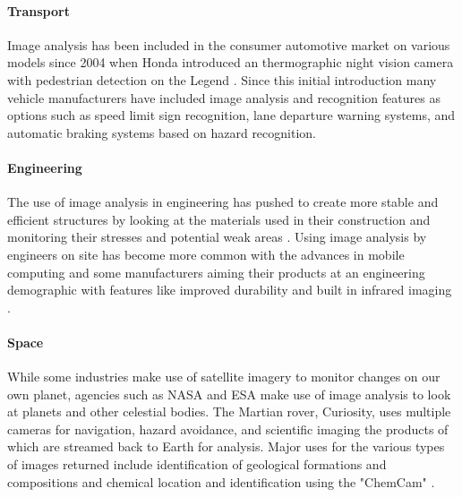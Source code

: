 	\paragraph{Transport}
	Image analysis has been included in the consumer automotive market on various models since 2004 when Honda introduced an thermographic night vision camera with pedestrian detection on the Legend  \citep{hondanightvision}. Since this initial introduction many vehicle manufacturers have included image analysis and recognition features as options such as speed limit sign recognition, lane departure warning systems, and automatic braking systems based on hazard recognition.
	\paragraph{Engineering}
	The use of image analysis in engineering has pushed to create more stable and efficient structures by looking at the materials used in their construction \citep{concreteanalysis} and monitoring their stresses and potential weak areas \citep{bridgecables}. Using image analysis by engineers on site has become more common with the advances in mobile computing and some manufacturers aiming their products at an engineering demographic with features like improved durability and built in infrared imaging \citep{catphone}.
	\paragraph{Space}
	While some industries make use of satellite imagery to monitor changes on our own planet, agencies such as NASA and ESA make use of image analysis to look at planets and other celestial bodies. The Martian rover, Curiosity, uses multiple cameras for navigation, hazard avoidance, and scientific imaging the products of which are streamed back to Earth for analysis. Major uses for the various types of images returned include identification of geological formations and compositions \citep{curiositysand, curiositygravel} and chemical location and identification using the "ChemCam" \citep{curiosityhydrogen}.